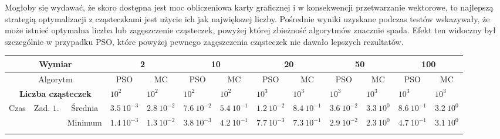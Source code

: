 \documentclass[11pt, a4paper, oneside]{article}
\begin{document}
Mogłoby się wydawać, że skoro dostępna jest moc obliczeniowa karty graficznej i w konsekwencji przetwarzanie wektorowe, to najlepszą strategią optymalizacji z cząsteczkami jest użycie ich jak największej liczby. Pośrednie wyniki uzyskane podczas testów wskazywały, że może istnieć optymalna liczba lub zagęszczenie cząsteczek, powyżej której zbieżność algorytmów znacznie spada. Efekt ten widoczny był szczególnie w przypadku PSO, które powyżej pewnego zagęszczenia cząsteczek nie dawało lepszych rezultatów.

\renewcommand{\arraystretch}{2}
\begin{table}[t]
\scriptsize
\begin{adjustwidth}{-1.76cm}{}
\centering
\begin{tabular}{|c|c|c|l|l|l|l|l|l|c|c|c|c|}
\hline
\multicolumn{3}{|c|}{Wymiar}                                   & \multicolumn{2}{c|}{2}                             & \multicolumn{2}{c|}{10}                            & \multicolumn{2}{c|}{20}                            & \multicolumn{2}{c|}{50}                                                         & \multicolumn{2}{c|}{100}                                                        \\ \hline
\multicolumn{3}{|c|}{Algorytm}                                 & \multicolumn{1}{c|}{PSO} & \multicolumn{1}{c|}{MC} & \multicolumn{1}{c|}{PSO} & \multicolumn{1}{c|}{MC} & \multicolumn{1}{c|}{PSO} & \multicolumn{1}{c|}{MC} & PSO                                    & MC                                     & PSO                                    & MC                                     \\ \hline
\multicolumn{3}{|c|}{\textbf{Liczba cząsteczek}}               & \textbf{$10^{2}$}        & \textbf{$10^{2}$}       & \textbf{$10^{2}$}        & \textbf{$10^{2}$}       & \textbf{$10^{3}$}        & \textbf{$10^{3}$}       & \multicolumn{1}{l|}{\textbf{$10^{3}$}} & \multicolumn{1}{l|}{\textbf{$10^{3}$}} & \multicolumn{1}{l|}{\textbf{$10^{3}$}} & \multicolumn{1}{l|}{\textbf{$10^{3}$}} \\ \hline
\multirow{4}{*}{Czas} & \multirow{4}{*}{Zad. $1$.} & Średnia   & $3.5 \ 10^{-3}$          & $2.8 \ 10^{-2}$         & $7.6 \ 10^{-2}$          & $5.4 \ 10^{-1}$         & $1.2 \ 10^{-2}$          & $8.4 \ 10^{-1}$         & \multicolumn{1}{l|}{$3.6 \ 10^{-2}$}   & \multicolumn{1}{l|}{$3.3 \ 10^{0}$}    & \multicolumn{1}{l|}{$8.6 \ 10^{-1}$}   & \multicolumn{1}{l|}{$3.2 \ 10^{0}$}    \\ \cline{3-13} 
                      &                            & Minimum   & $1.4 \ 10^{-3}$          & $1.3 \ 10^{-2}$         & $3.8 \ 10^{-3}$          & $4.2 \ 10^{-1}$         & $7.7 \ 10^{-3}$          & $7.3 \ 10^{-1}$         & \multicolumn{1}{l|}{$2.9 \ 10^{-2}$}   & \multicolumn{1}{l|}{$2.3 \ 10^{0}$}    & \multicolumn{1}{l|}{$4.7 \ 10^{-1}$}   & \multicolumn{1}{l|}{$3.1 \ 10^{0}$}    \\ \cline{3-13} 

\end{tabular}
\end{adjustwidth}
\end{table}
\end{document}
